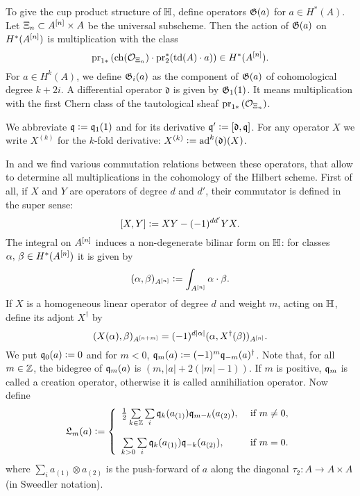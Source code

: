 \begin{definition}
To give the cup product structure of $\mathbb{H}$, define operators $\mathfrak{G}(a)$ for $a \in H^*(A)$. Let $\Xi_n \subset A^{[n]}\times A$ be the universal subscheme. Then the action of $\mathfrak{G}(a)$ on $H^*(A^{[n]})$ is multiplication with the class
$$
\operatorname{pr}_{1*}\left( \operatorname{ch}(\mathcal{O}_{\Xi_n})\cdot \operatorname{pr}_2^*(\operatorname{td}(A)\cdot a) \right) \in H^*(A^{[n]}).
$$
For $a \in H^k(A)$, we define $\mathfrak{G}_i(a)$ as the component of $\mathfrak{G}(a)$ of cohomological degree $k+2i$. A differential operator $\mathfrak{d}$ is given by $\mathfrak{G}_1(1)$. It means multiplication with the first Chern class of the tautological sheaf $\operatorname{pr}_{1*}\left( \mathcal{O}_{\Xi_n}\right)$.
\end{definition}
\begin{notation} 
We abbreviate $\mathfrak{q} \vcentcolon=  \mathfrak{q}_1(1)$ and for its derivative $\mathfrak{q}'\vcentcolon=  [\mathfrak d, \mathfrak{q}]$. For any operator $X$ we write $X^{(k)}$ for the $k$-fold derivative: $X^{(k)} \vcentcolon= \operatorname{ad}^k(\mathfrak{d}) (X)$.
\end{notation}
In \cite{LehnSorger} and \cite{LiQinWang} we find various commutation relations between these operators, that allow to determine all multiplications in the cohomology of the Hilbert scheme. First of all, if $X$ and $Y$ are operators of degree $d$ and $d'$, their commutator is defined in the super sense: 
$$
[X,Y] \vcentcolon=  XY - (-1)^{dd'}YX.
$$
The integral on $A^{[n]}$ induces a non-degenerate bilinar form on $\mathbb{H}$: for classes $\alpha,\,\beta\in H^*(A^{[n]})$ it is given by
$$
(\alpha,\beta)_{A^{[n]}} \vcentcolon=   \int_{A^{[n]}}\alpha\cdot\beta.
$$
If $X$ is a homogeneous linear operator of degree $d$ and weight $m$, acting on $\mathbb{H}$, define its adjont $X^\dagger$ by
$$
(X(\alpha),\beta)_{A^{[n+m]}}  = (-1)^{d|\alpha|}( \alpha , X^\dagger (\beta))_{A^{[n]}}.
$$
We put $\mathfrak{q}_0(a) \vcentcolon= 0$ and for $m<0$, $\mathfrak{q}_m(a) \vcentcolon=  (-1)^m \mathfrak{q}_{-m}(a)^\dagger$. Note that, for all $m\in\mathbb{Z}$, the bidegree of $\mathfrak{q}_m(a)$ is $(m,|a| + 2(|m|-1))$. If $m$ is positive, $\mathfrak{q}_m$ is called a creation operator, otherwise it is called annihiliation operator. Now define
$$
\mathfrak{L}_m(a) \defIs  \left\{ 
\begin{array}{ll}
 \tfrac{1}{2}\sum\limits_{k\in\Z}\sum\limits_{i}\q_k( a_{(1)})\q_{m-k}( a_{(2)}), & \text{ if } m\neq 0, \vspace{4mm}\\
 \sum\limits_{k>0}\sum\limits_{i}\q_k( a_{(1)})\q_{-k}( a_{(2)}), & \text{ if } m= 0. \\
\end{array}
\right.
$$
where $\sum_i a_{(1)}\otimes  a_{(2)}$ is the push-forward of $a$ along the diagonal $\tau_2 :A \rightarrow A\times A$ (in Sweedler notation).
